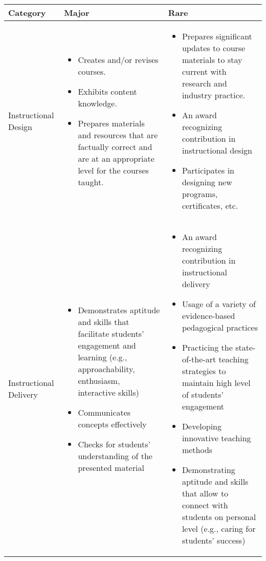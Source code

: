\documentclass{scrartcl}
\begin{document}
\begin{longtable}{p{2cm}p{6cm}P{6cm}}

\hline
\textbf{Category} & \textbf{Major} & \textbf{Rare}\\
\hline
\endhead %
 Instructional Design 
 & \vspace{-\baselineskip}%
  \begin{itemize}[noitemsep,leftmargin=*,topsep=0pt,partopsep=0pt]
        \item Creates and/or revises courses.
        \item Exhibits content knowledge.       
        \item Prepares materials and resources that are factually correct and are at an appropriate level for the courses taught.
    \end{itemize}
  & %
    \begin{itemize}[noitemsep,leftmargin=*,topsep=0pt,partopsep=0pt]
        \item Prepares significant updates to course materials to stay current with research and industry practice.
        \item An award recognizing contribution in instructional design
        \item Participates in designing new programs, certificates, etc. 
    \end{itemize}\\ 
\hline
Instructional Delivery
 & \vspace{-\baselineskip}%
  \begin{itemize}[noitemsep,leftmargin=*,topsep=0pt,partopsep=0pt]
        \item Demonstrates aptitude and skills that facilitate students’ engagement and learning (e.g., approachability, enthusiasm, interactive skills)
        \item Communicates concepts effectively       
        \item Checks for students’ understanding of the presented material
    \end{itemize}
  & %
    \begin{itemize}[noitemsep,leftmargin=*,topsep=0pt,partopsep=0pt]
        \item An award recognizing contribution in instructional delivery
        \item Usage of a variety of evidence-based pedagogical practices
        \item Practicing the state-of-the-art teaching strategies to maintain high level of students’ engagement
        \item Developing innovative teaching methods
        \item Demonstrating aptitude and skills that allow to connect with students on personal level (e.g., caring for students’ success)


\end{itemize}
\end{longtable}
\end{document}
